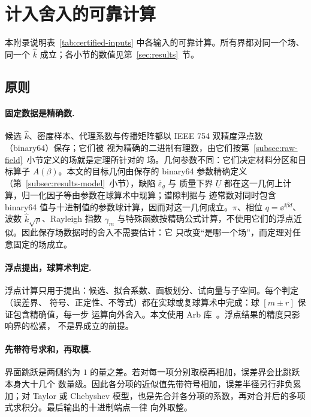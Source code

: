 \section{计入舍入的可靠计算}
\label{app:reliable}

本附录说明表~\ref{tab:certified-inputs} 中各输入的可靠计算。所有界都对同一个场、同一个
$\widehat k$ 成立；各小节的数值见第~\ref{sec:results}~节。

\subsection{原则}
\label{app:reliable-ball}

\paragraph{固定数据是精确数.}
候选 $\widehat k$、密度样本、代理系数与传播矩阵都以 IEEE 754 双精度浮点数（binary64）保存；它们被
视为精确的二进制有理数，由它们按第~\ref{subsec:raw-field}~小节定义的场就是定理所针对的
场。几何参数不同：它们决定材料分区和目标算子 $A(\beta)$。本文的目标几何由保存的
binary64 参数精确定义（第~\ref{subsec:results-model}~小节），缺陷 $\overline\varepsilon_g$ 与
质量下界 $\underline U$ 都在这一几何上计算，归一化因子等由参数在球算术中现算；谱隙判据与
迹常数对同时包含 binary64 值与十进制值的参数球计算，因而对这一几何成立。$\pi$、相位 $q=\ee^{\ii\beta d}$、波数 $\widehat k\sqrt{\rho}$、Rayleigh 指数 $\gamma_m$
与特殊函数按精确公式计算，不使用它们的浮点近似。因此保存场数据时的舍入不需要估计：它
只改变“是哪一个场”，而定理对任意固定的场成立。

\paragraph{浮点提出，球算术判定.}
浮点计算只用于提出：候选、拟合系数、面板划分、试向量与子空间。每个判定（误差界、
符号、正定性、不等式）都在实球或复球算术中完成：球 $[m\pm r]$ 保证包含精确值，每一步
运算向外舍入。本文使用 Arb 库~\cite{Johansson2017}。浮点结果的精度只影响界的松紧，
不是界成立的前提。

\paragraph{先带符号求和，再取模.}
界面跳跃是两侧约为 $1$ 的量之差。若对每一项分别取模再相加，误差界会比跳跃本身大十几个
数量级。因此各分项的近似值先带符号相加，误差半径另行非负累加；对 Taylor 或 Chebyshev
模型，也是先合并各分项的系数，再对合并后的多项式求积分。最后输出的十进制端点一律
向外取整。

